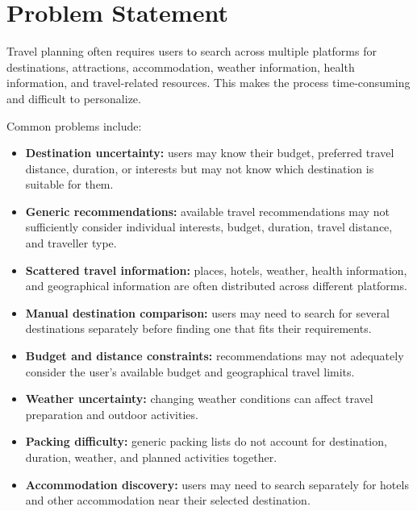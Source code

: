 \documentclass[11pt,a4paper]{article}
\begin{document}

\section{Problem Statement}

Travel planning often requires users to search across multiple platforms for destinations, attractions, accommodation, weather information, health information, and travel-related resources. This makes the process time-consuming and difficult to personalize.

Common problems include:

\begin{itemize}

\item \textbf{Destination uncertainty:} users may know their budget, preferred travel distance, duration, or interests but may not know which destination is suitable for them.

\item \textbf{Generic recommendations:} available travel recommendations may not sufficiently consider individual interests, budget, duration, travel distance, and traveller type.

\item \textbf{Scattered travel information:} places, hotels, weather, health information, and geographical information are often distributed across different platforms.

\item \textbf{Manual destination comparison:} users may need to search for several destinations separately before finding one that fits their requirements.

\item \textbf{Budget and distance constraints:} recommendations may not adequately consider the user's available budget and geographical travel limits.

\item \textbf{Weather uncertainty:} changing weather conditions can affect travel preparation and outdoor activities.

\item \textbf{Packing difficulty:} generic packing lists do not account for destination, duration, weather, and planned activities together.

\item \textbf{Accommodation discovery:} users may need to search separately for hotels and other accommodation near their selected destination.


\end{itemize}
\end{document}

